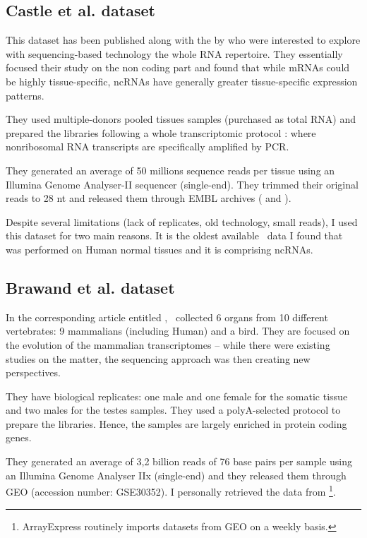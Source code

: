 \subsection{Castle et al. dataset}

This dataset has been published along with the 
by \citet{castleData} who were interested to explore
with sequencing-based technology the whole RNA repertoire. They essentially
focused their study on the non coding part and found that
while \glspl{mRNA} could be highly tissue-specific, \glspl{ncRNA} have generally
greater tissue-specific expression patterns.

They used multiple-donors pooled tissues samples (purchased as total \gls{RNA})
and prepared the libraries following a whole transcriptomic protocol
\citep{Armour:2009}: where nonribosomal \gls{RNA} transcripts are
specifically amplified by \gls{PCR}.

They generated an average of 50 millions sequence reads per tissue
using an Illumina Genome Analyser-II sequencer (single-end).
They trimmed their original reads to 28 \gls{nt}
and released them through EMBL archives (
and ).

Despite several limitations (lack of replicates, old technology, small reads),
I used this dataset for two main reasons. It is the oldest available \Rnaseq\
data I found that was performed on Human normal tissues and it is comprising
\glspl{ncRNA}.


\subsection{Brawand et al. dataset}

In the corresponding article entitled ,
\citet{VTpaper}~collected 6 organs from 10 different vertebrates:
9 mammalians (including Human) and a bird. They are focused on the
evolution of the mammalian transcriptomes -- while there were existing studies
on the matter, the sequencing approach was then creating new perspectives.

They have biological replicates: one male
and one female for the somatic tissue and two males for the testes samples.
They used a
polyA-selected protocol to prepare the libraries. Hence, the samples are largely
enriched in protein coding genes.

They generated an average of 3,2 billion reads of 76 base pairs per sample
using an Illumina Genome Analyser IIx (single-end) and they released them
through \gls{GEO} (accession number: GSE30352).
I personally retrieved the data from
\footnote{ArrayExpress routinely imports
datasets from \gls{GEO} on a weekly basis.}.

